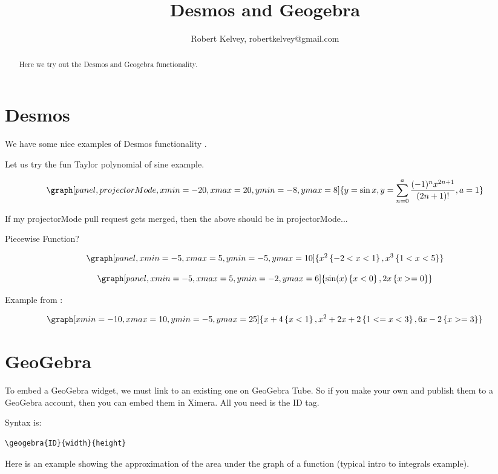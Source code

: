 \documentclass{ximera}
\title{Desmos and Geogebra}
\author{Robert Kelvey, robertkelvey@gmail.com}
\begin{document}
\begin{abstract}
Here we try out the Desmos and Geogebra functionality.
\end{abstract}
\maketitle

\section{Desmos}

We have some nice examples of Desmos functionality . 

Let us try the fun Taylor polynomial of sine example.

\[
    \graph[panel, projectorMode, xmin=-20, xmax=20, ymin=-8, ymax=8]{y=\sin x, y=\sum _{n=0}^a\frac{(-1)^n x^{2n+1}}{(2n+1)!}, a=1}
\]

If my projectorMode pull request gets merged, then the above should be in projectorMode...

Piecewise Function?

\[
    \graph[panel,xmin=-5, xmax=5, ymin=-5, ymax=10]{ x^2\left\{-2 < x < 1 \right\}, x^3 \left\{1<x<5\right\}}
\]

\[
    \graph[panel,xmin=-5, xmax=5, ymin=-2, ymax=6]{ \sin(x)\left\{x<0\right\}, 2x\left\{ x>=0 \right\} }
\]

Example from :

\[
       \graph[xmin=-10, xmax=10, ymin=-5, ymax=25]{ x+4\left\{x<1\right\}, x^2+2x+2\left\{1<= x < 3\right\}, 6x-2\left\{x>=3\right\} }
\]


\section{GeoGebra}

To embed a GeoGebra widget, we must link to an existing one on GeoGebra Tube. So if you make your own and publish them to a GeoGebra account, then you can embed them in Ximera. All you need is the ID tag.

Syntax is: \begin{verbatim}\geogebra{ID}{width}{height} \end{verbatim}

Here is an example showing the approximation of the area under the graph of a function (typical intro to integrals example).

\end{document}
